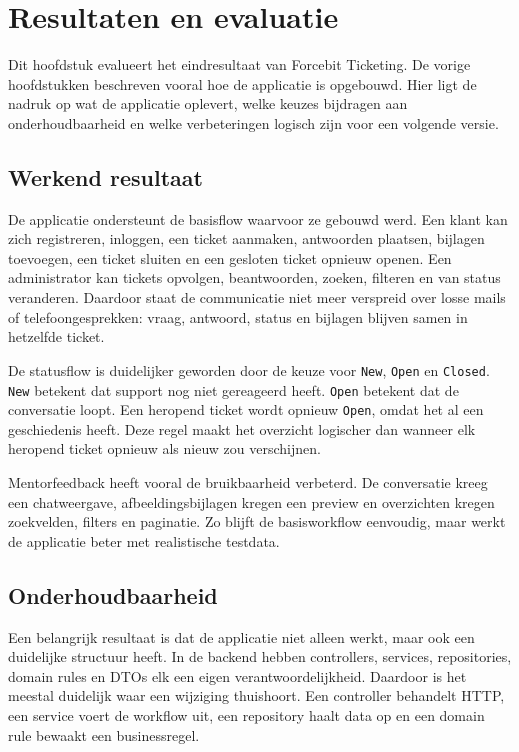 
\chapter{Resultaten en evaluatie}%
\label{ch:resultaten}

Dit hoofdstuk evalueert het eindresultaat van Forcebit Ticketing. De vorige hoofdstukken beschreven vooral hoe de applicatie is opgebouwd. Hier ligt de nadruk op wat de applicatie oplevert, welke keuzes bijdragen aan onderhoudbaarheid en welke verbeteringen logisch zijn voor een volgende versie.

\section{Werkend resultaat}

De applicatie ondersteunt de basisflow waarvoor ze gebouwd werd. Een klant kan zich registreren, inloggen, een ticket aanmaken, antwoorden plaatsen, bijlagen toevoegen, een ticket sluiten en een gesloten ticket opnieuw openen. Een administrator kan tickets opvolgen, beantwoorden, zoeken, filteren en van status veranderen. Daardoor staat de communicatie niet meer verspreid over losse mails of telefoongesprekken: vraag, antwoord, status en bijlagen blijven samen in hetzelfde ticket.

De statusflow is duidelijker geworden door de keuze voor \texttt{New}, \texttt{Open} en \texttt{Closed}. \texttt{New} betekent dat support nog niet gereageerd heeft. \texttt{Open} betekent dat de conversatie loopt. Een heropend ticket wordt opnieuw \texttt{Open}, omdat het al een geschiedenis heeft. Deze regel maakt het overzicht logischer dan wanneer elk heropend ticket opnieuw als nieuw zou verschijnen.

Mentorfeedback heeft vooral de bruikbaarheid verbeterd. De conversatie kreeg een chatweergave, afbeeldingsbijlagen kregen een preview en overzichten kregen zoekvelden, filters en paginatie. Zo blijft de basisworkflow eenvoudig, maar werkt de applicatie beter met realistische testdata.

\section{Onderhoudbaarheid}

Een belangrijk resultaat is dat de applicatie niet alleen werkt, maar ook een duidelijke structuur heeft. In de backend hebben controllers, services, repositories, domain rules en DTOs elk een eigen verantwoordelijkheid. Daardoor is het meestal duidelijk waar een wijziging thuishoort. Een controller behandelt HTTP, een service voert de workflow uit, een repository haalt data op en een domain rule bewaakt een businessregel.

